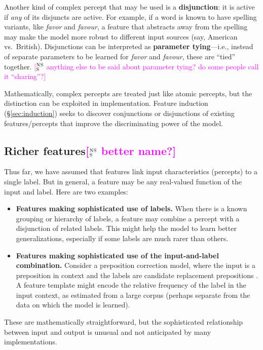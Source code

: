 \documentclass[11pt,letterpaper]{article}
\newcommand{\ensuretext}[1]{#1}
\newcommand{\nssmarker}{\ensuretext{\textcolor{magenta}{\ensuremath{^{\textsc{NS}}_{\textsc{S}}}}}}
\newcommand{\arkcomment}[3]{\ensuretext{\textcolor{#3}{[#1 #2]}}}
\newcommand{\nss}[1]{\arkcomment{\nssmarker}{#1}{magenta}}
\newcommand{\Sref}[1]{\S\ref{#1}}
\begin{document}
Another kind of complex percept that may be used is a \textbf{disjunction}: it is active if 
{\em any} of its disjuncts are active. For example, if a word is known to have spelling variants, 
like \textit{favor} and \textit{favour}, a feature that abstracts away from the spelling 
may make the model more robust to different input sources (say, American vs.~British).
Disjunctions can be interpreted as \textbf{parameter tying}---i.e., instead of separate parameters 
to be learned for \textit{favor} and \textit{favour}, these are ``tied'' together.
\nss{anything else to be said about parameter tying? do some people call it ``sharing''?}

Mathematically, complex percepts are treated just like atomic percepts, 
but the distinction can be exploited in implementation.
Feature induction (\Sref{sec:induction}) seeks to discover conjunctions or disjunctions of 
existing features/percepts that improve the discriminating power of the model.


\subsection{Richer features\nss{better name?}}\label{sec:richer}

Thus far, we have assumed that features link input characteristics (percepts) 
to a single label. But in general, a feature may be any real-valued function of the input and label.
Here are two examples:

\begin{itemize}
\item \textbf{Features making sophisticated use of labels.} 
When there is a known grouping or hierarchy of labels, a feature may combine a percept 
with a disjunction of related labels. This might help the model to learn better generalizations, 
especially if some labels are much rarer than others.

\item \textbf{Features making sophisticated use of the input-and-label combination.}
Consider a preposition correction model, where the input is a preposition in context 
and the labels are candidate replacement prepositions \citep[as in][]{han-10}. 
A feature template might encode the relative frequency of the label in the input context, 
as estimated from a large corpus (perhaps separate from the data on which the model is learned).
\end{itemize}

These are mathematically straightforward, but the sophisticated relationship between input and output 
is unusual and not anticipated by many implementations.
\end{document}
